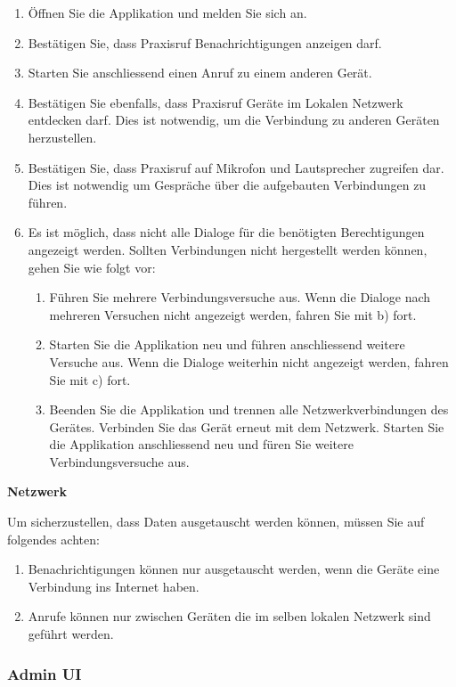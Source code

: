\begin{enumerate}
    \item Öffnen Sie die Applikation und melden Sie sich an.
    \item Bestätigen Sie, dass Praxisruf Benachrichtigungen anzeigen darf.
    \item Starten Sie anschliessend einen Anruf zu einem anderen Gerät.
    \item Bestätigen Sie ebenfalls, dass Praxisruf Geräte im Lokalen Netzwerk entdecken darf.
    Dies ist notwendig, um die Verbindung zu anderen Geräten herzustellen.
    \item Bestätigen Sie, dass Praxisruf auf Mikrofon und Lautsprecher zugreifen dar.
    Dies ist notwendig um Gespräche über die aufgebauten Verbindungen zu führen.
    \item Es ist möglich, dass nicht alle Dialoge für die benötigten Berechtigungen angezeigt werden.
    Sollten Verbindungen nicht hergestellt werden können, gehen Sie wie folgt vor:
    \begin{enumerate}
              \item Führen Sie mehrere Verbindungsversuche aus. Wenn die Dialoge nach mehreren Versuchen nicht angezeigt werden, fahren Sie mit b) fort.
              \item Starten Sie die Applikation neu und führen anschliessend weitere Versuche aus. Wenn die Dialoge weiterhin nicht angezeigt werden, fahren Sie mit c) fort.
              \item Beenden Sie die Applikation und trennen alle Netzwerkverbindungen des Gerätes. Verbinden Sie das Gerät erneut mit dem Netzwerk. Starten Sie die Applikation anschliessend neu und füren Sie weitere Verbindungsversuche aus.
    \end{enumerate}
\end{enumerate}

\textbf{Netzwerk}

Um sicherzustellen, dass Daten ausgetauscht werden können, müssen Sie auf folgendes achten:

\begin{enumerate}
    \item Benachrichtigungen können nur ausgetauscht werden, wenn die Geräte eine Verbindung ins Internet haben.
    \item Anrufe können nur zwischen Geräten die im selben lokalen Netzwerk sind geführt werden.
\end{enumerate}

\subsubsection*{Admin UI}

